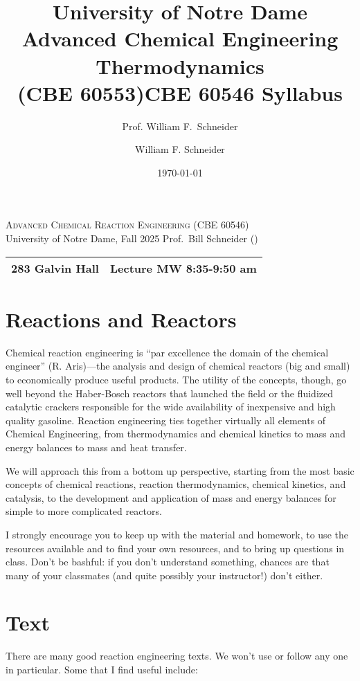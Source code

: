 \documentclass[11pt]{article}
\title{University of Notre Dame\\Advanced Chemical Engineering Thermodynamics\\(CBE 60553)}
\author{Prof. William F.\ Schneider}
\author{William F. Schneider}
\date{\today}
\title{CBE 60546 Syllabus}
\begin{document}
\begin{OPTIONS}
\end{OPTIONS}

\begin{center}
\textsc{\Large Advanced Chemical Reaction Engineering (CBE 60546)}\\University of Notre Dame, Fall 2025
Prof.\ Bill Schneider ()
\end{center}
\begin{tabular*}{\textwidth}{@{\extracolsep{\fill}}l r}
\hline
283 Galvin Hall & Lecture MW 8:35-9:50 am\\
\hline
\end{tabular*}
\section{Reactions and Reactors}
\label{sec:org8736af6}
Chemical reaction engineering is ``par excellence the domain of the chemical engineer'' (R. Aris)---the analysis and design of chemical reactors (big and small) to economically produce useful products.  The utility of the concepts, though, go well beyond the Haber-Bosch reactors that launched the field or the fluidized catalytic crackers responsible for the wide availability of inexpensive and high quality gasoline.  Reaction engineering ties together virtually all elements of Chemical Engineering, from thermodynamics and chemical kinetics to mass and energy balances to mass and heat transfer.  

We will approach this from a bottom up perspective, starting from the most basic concepts of chemical reactions, reaction thermodynamics, chemical kinetics, and catalysis, to the development and application of mass and energy balances for simple to more complicated reactors. 

I strongly encourage you to keep up with the material and homework, to use the resources available and to find your own resources, and to bring up questions in class. Don’t be bashful: if you don’t understand something, chances are that many of your classmates (and quite possibly your instructor!) don’t either.
\section{Text}
\label{sec:org3fd3228}
There are many good reaction engineering texts. We won't use or follow any one in particular. Some that I find useful include: 
\end{document}
